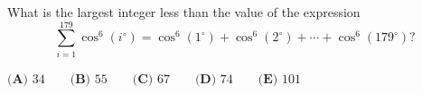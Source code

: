 What is the largest integer less than the value of the expression \[
\sum_{i=1}^{179}\cos^6(i^{\circ}) = \cos^6(1^{\circ}) + \cos^6(2^{\circ}) + \cdots + \cos^6(179^{\circ})?
\]

$\textbf{(A) } 34 \qquad\textbf{(B) } 55 \qquad\textbf{(C) } 67 \qquad\textbf{(D) } 74 \qquad\textbf{(E) } 101$
